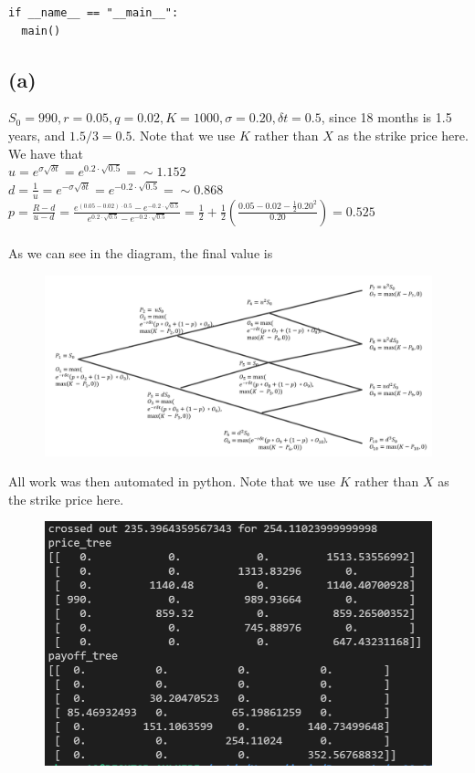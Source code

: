 \documentclass{article}
\begin{document}
{\begin{verbatim}
if __name__ == "__main__":
  main()

\end{verbatim}

\newpage

\subsection*{(a)}

$S_0 = 990, r = 0.05, q = 0.02, K = 1000, \sigma = 0.20, \delta t = 0.5$, since 18 months is 1.5 years, and $1.5 / 3 = 0.5$. Note that we use $K$ rather than $X$ as the strike price here. \\
We have that \\
$u = e^{\sigma\sqrt{\delta t}} = e^{0.2 \cdot \sqrt{0.5}} = \sim 1.152$ \\
$d = \frac{1}{u} = e^{-\sigma\sqrt{\delta t}} = e^{-0.2 \cdot \sqrt{0.5}} = \sim 0.868$ \\
$p = \frac{R - d}{u - d} = \frac{e^{(0.05 - 0.02) \cdot 0.5} - e^{-0.2 \cdot \sqrt{0.5}}}{e^{0.2 \cdot \sqrt{0.5}} - e^{-0.2 \cdot \sqrt{0.5}}} = \frac{1}{2} + \frac{1}{2}(\frac{0.05 - 0.02 - \frac{1}{2}0.20^2}{0.20}) = 0.525$ \\ \\
As we can see in the diagram, the final value is 

\begin{figure}[h]
  \centering
  \includegraphics[width=120mm]{./2a_tree.png}
\end{figure}

All work was then automated in python. Note that we use $K$ rather than $X$ as the strike price here. 

\begin{figure}[h]
  \centering
  \includegraphics[width=120mm]{./2a.png}
\end{figure}

}
\end{document}
